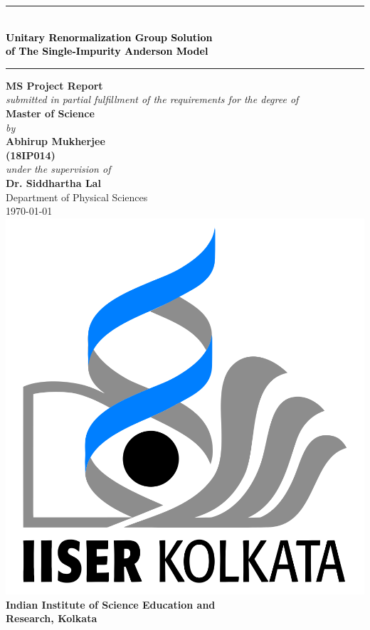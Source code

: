 \documentclass[twoside,11pt]{report}
\numberwithin{equation}{section}
\begin{document}
\begin{titlepage}
	\centering
	\rule{\textwidth}{3pt}\\
	\vspace*{25pt}
	\textcolor{black}{ %
		\textbf{\LARGE Unitary Renormalization Group Solution}\\[10pt]
		\textbf{\LARGE of The Single-Impurity Anderson Model}
	\vspace*{25pt}
	}
	\rule{\textwidth}{3pt} %
	\vfill
	{\Large \textbf{MS Project Report}}\\
	\vfill
	\textit{\large{ submitted in partial fulfillment of the requirements for the degree of }}\\
	\vfill
	{\Large \textbf{Master of Science\\}}
	\vfill
	\textit{\large by \\}
	\vfill
	{\Large \textbf{Abhirup Mukherjee \\}}
	\vspace*{5pt}
	{\Large \textbf{(18IP014)\\}}
	\vfill
	\textit{\large under the supervision of \\}
	\vfill
	{\Large \textbf{Dr. Siddhartha Lal}\\
	\vfill
	\Large Department of Physical Sciences\\
	\vfill
	\today}
	\vfill
	\includegraphics[scale=0.15]{../figures/logo.png}\\
	\vspace{0.01\textheight}
	\textbf{\Large Indian Institute of Science Education and \\[10pt]}
	\textbf{\Large Research, Kolkata}\
\end{titlepage}
\end{document}
